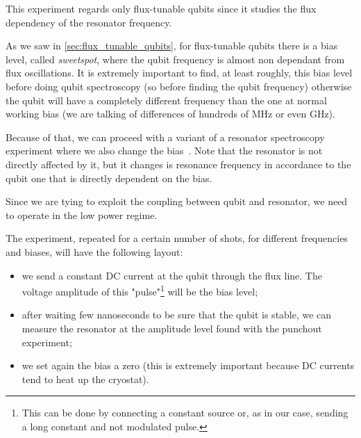 
This experiment regards only flux-tunable qubits since it studies the flux dependency of the resonator frequency.

As we saw in \cref{sec:flux_tunable_qubits}, for flux-tunable qubits there is a bias level, called \textit{sweetspot}, where the qubit frequency is almost non dependant from flux oscillations.
It is extremely important to find, at least roughly, this bias level before doing qubit spectroscopy (so before finding the qubit frequency) otherwise the qubit will have a completely different frequency than the one at normal working bias (we are talking of differences of hundreds of MHz or even GHz).

Because of that, we can proceed with a variant of a resonator spectroscopy experiment where we also change the bias~\cite{Greene2014}.
Note that the resonator is not directly affected by it, but it changes is resonance frequency in accordance to the qubit one that is directly dependent on the bias.

Since we are tying to exploit the coupling between qubit and resonator, we need to operate in the low power regime.

The experiment, repeated for a certain number of shots, for different frequencies and biases, will have the following layout:
\begin{itemize}
    \item we send a constant DC current at the qubit through the flux line. The voltage amplitude of this "pulse"\footnote{This can be done by connecting a constant source or, as in our case, sending a long constant and not modulated pulse.} will be the bias level;
    \item after waiting few nanoseconds to be sure that the qubit is stable, we can measure the resonator at the amplitude level found with the punchout experiment;
    \item we set again the bias a zero (this is extremely important because DC currents tend to heat up the cryostat).
\end{itemize}

